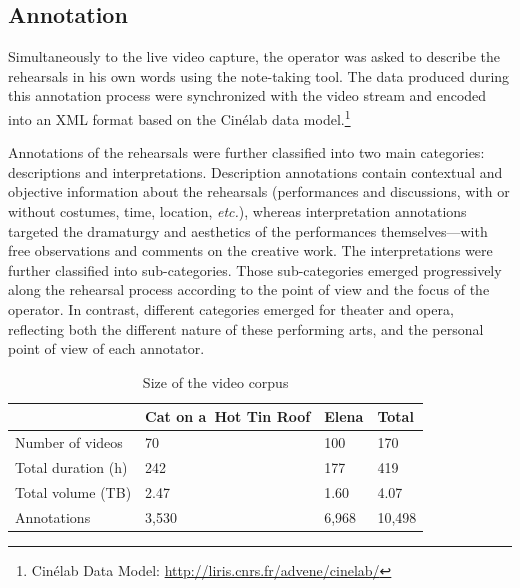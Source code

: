 \documentclass[conference]{IEEEtran}
\newcommand{\todo}[1]{\noindent\textcolor{red}{{\bf \{ToDo} #1{\bf \}}}}
\begin{document}

\subsection{Annotation}
Simultaneously to the live video capture, the operator was asked to describe the rehearsals in his own words using  the note-taking tool. The data produced during this annotation process were synchronized with the video stream and encoded into an XML format based on the Cinélab data model.\footnote{Cinélab Data Model: \url{http://liris.cnrs.fr/advene/cinelab/}}

Annotations of the  rehearsals were further classified  into two main categories: descriptions and interpretations.  Description annotations contain contextual and objective information about the rehearsals  (performances and  discussions, with or without costumes, time, location, \emph{etc.}), whereas interpretation annotations targeted the dramaturgy and aesthetics of the performances themselves---with free observations and comments on the creative work. The interpretations were further classified into  sub-categories. Those sub-categories emerged progressively along the rehearsal process according to the point of view and the focus of the operator. 
In contrast, different categories emerged for theater and opera, reflecting both the different nature of these performing arts, and the personal point of view of each annotator.

\begin{table}
\small
\begin{tabular}{|p{2.8cm}|p{1.8cm}|p{1.2cm}|p{1.2cm}|}
\hline 
  & Cat on a~Hot Tin Roof  & Elena & Total \\ 
\hline 
Number of videos & 70 & 100 & 170 \\ 
\hline 
Total duration (h) & 242 & 177 & 419 \\ 
\hline 
Total volume (TB) & 2.47 & 1.60 & 4.07 \\ 
\hline 
Annotations & 3,530 & 6,968 & 10,498\\ 
\hline
\end{tabular} 
\caption{Size of the video corpus}
\label{table_facts}
\end{table}
\end{document}
